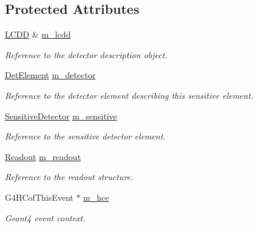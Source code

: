 \subsection*{Protected Attributes}
\begin{DoxyCompactItemize}
\item 
\hyperlink{class_d_d4hep_1_1_geometry_1_1_l_c_d_d}{L\+C\+DD} \& \hyperlink{class_d_d4hep_1_1_simulation_1_1_geant4_sensitive_detector_af2c638cb0b0a50437852cf6fb57ef7f1}{m\+\_\+lcdd}
\begin{DoxyCompactList}\small\item\em Reference to the detector description object. \end{DoxyCompactList}\item 
\hyperlink{class_d_d4hep_1_1_geometry_1_1_det_element}{Det\+Element} \hyperlink{class_d_d4hep_1_1_simulation_1_1_geant4_sensitive_detector_a0483eb9c4a7e8d31c499239867b53ff1}{m\+\_\+detector}
\begin{DoxyCompactList}\small\item\em Reference to the detector element describing this sensitive element. \end{DoxyCompactList}\item 
\hyperlink{class_d_d4hep_1_1_simulation_1_1_geant4_sensitive_detector_a6375f9a4f776b531e443483ff9fa8c28}{Sensitive\+Detector} \hyperlink{class_d_d4hep_1_1_simulation_1_1_geant4_sensitive_detector_a6292e7640bd34206cb682962570a6721}{m\+\_\+sensitive}
\begin{DoxyCompactList}\small\item\em Reference to the sensitive detector element. \end{DoxyCompactList}\item 
\hyperlink{class_d_d4hep_1_1_geometry_1_1_readout}{Readout} \hyperlink{class_d_d4hep_1_1_simulation_1_1_geant4_sensitive_detector_a896a6c6cb7ea1a05384a0a36516da34f}{m\+\_\+readout}
\begin{DoxyCompactList}\small\item\em Reference to the readout structure. \end{DoxyCompactList}\item 
G4\+H\+Cof\+This\+Event $\ast$ \hyperlink{class_d_d4hep_1_1_simulation_1_1_geant4_sensitive_detector_abba73e5c3e4dfb26cc46bb5c165cf225}{m\+\_\+hce}
\begin{DoxyCompactList}\small\item\em Geant4 event context. \end{DoxyCompactList}\end{DoxyCompactItemize}


